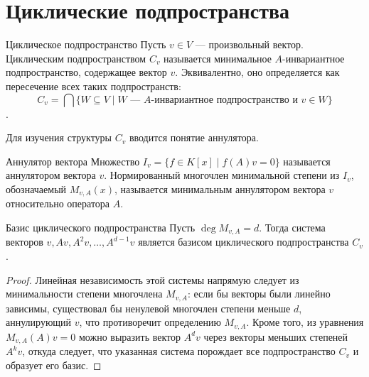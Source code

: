 
\section{Циклические подпространства}

\begin{Definition}{Циклическое подпространство}{}
	Пусть $v \in V$ --- произвольный вектор. Циклическим подпространством $C_v$ называется минимальное $A$-инвариантное подпространство, содержащее вектор $v$. Эквивалентно, оно определяется как пересечение всех таких подпространств:
	\[
	C_v = \bigcap\{W \subseteq V \mid W \text{ — $A$-инвариантное подпространство и } v \in W\}
	\].
\end{Definition}

Для изучения структуры $C_v$ вводится понятие аннулятора.

\begin{Definition}{Аннулятор вектора}{}
	Множество $I_v = \{ f \in K[x] \mid f(A)v = 0 \}$ называется аннулятором вектора $v$. Нормированный многочлен минимальной степени из $I_v$, обозначаемый $M_{v,A}(x)$, называется минимальным аннулятором вектора $v$ относительно оператора $A$.
\end{Definition}

\begin{Proposition}{Базис циклического подпространства}{}
	Пусть $\deg M_{v,A} = d$. Тогда система векторов $v, Av, A^2v, \dots, A^{d-1}v$
	является базисом циклического подпространства $C_v$.
\end{Proposition}

\begin{proof}
	Линейная независимость этой системы напрямую следует из минимальности степени многочлена $M_{v,A}$: если бы векторы были линейно зависимы, существовал бы ненулевой многочлен степени меньше $d$, аннулирующий $v$, что противоречит определению $M_{v,A}$. Кроме того, из уравнения $M_{v,A}(A)v = 0$ можно выразить вектор $A^dv$ через векторы меньших степеней $A^kv$, откуда следует, что указанная система порождает все подпространство $C_v$ и образует его базис.
\end{proof}
